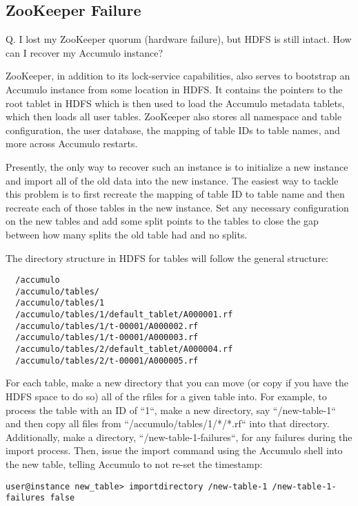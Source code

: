 \subsection{ZooKeeper Failure}
Q. I lost my ZooKeeper quorum (hardware failure), but HDFS is still intact. How can I recover my Accumulo instance?

ZooKeeper, in addition to its lock-service capabilities, also serves to bootstrap an Accumulo
instance from some location in HDFS. It contains the pointers to the root tablet in HDFS which
is then used to load the Accumulo metadata tablets, which then loads all user tables. ZooKeeper
also stores all namespace and table configuration, the user database, the mapping of table IDs to 
table names, and more across Accumulo restarts.

Presently, the only way to recover such an instance is to initialize a new instance and import all
of the old data into the new instance. The easiest way to tackle this problem is to first recreate
the mapping of table ID to table name and then recreate each of those tables in the new instance. 
Set any necessary configuration on the new tables and add some split points to the tables to close 
the gap between how many splits the old table had and no splits.

The directory structure in HDFS for tables will follow the general structure:

\small
\begin{verbatim}
  /accumulo
  /accumulo/tables/
  /accumulo/tables/1
  /accumulo/tables/1/default_tablet/A000001.rf
  /accumulo/tables/1/t-00001/A000002.rf
  /accumulo/tables/1/t-00001/A000003.rf
  /accumulo/tables/2/default_tablet/A000004.rf
  /accumulo/tables/2/t-00001/A000005.rf
\end{verbatim}
\normalsize

For each table, make a new directory that you can move (or copy if you have the HDFS space to do so)
all of the rfiles for a given table into. For example, to process the table with an ID of ``1``, make a new directory, 
say ``/new-table-1`` and then copy all files from ``/accumulo/tables/1/*/*.rf`` into that directory. Additionally,
make a directory, ``/new-table-1-failures``, for any failures during the import process. Then, issue the import
command using the Accumulo shell into the new table, telling Accumulo to not re-set the timestamp:

\small
\begin{verbatim}
user@instance new_table> importdirectory /new-table-1 /new-table-1-failures false
\end{verbatim}
\normalsize

